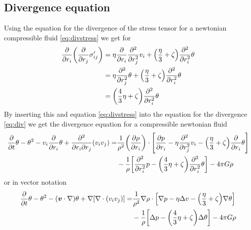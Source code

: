\subsection{Divergence equation}
Using the equation for the divergence of the stress tensor
for a newtonian compressible fluid \eqref{eq:divstress} we get for
\begin{align}
\begin{split}
\pd{r_i}\lra{\pd{r_j}\sigma'_{ij}}&=
\eta\pd{r_i}\pdd{r_j}v_i+\lra{\frac{\eta}{3}+\zeta}\pdd{r_i}\theta\\
&=\eta\pdd{r_j}\theta+\lra{\frac{\eta}{3}+\zeta}\pdd{r_i}\theta\\
&=\lra{\frac{4}{3}\eta+\zeta}\pdd{r_i}\theta
\end{split}
\end{align}
By inserting this and equation \eqref{eq:divstress} into the equation for the
divergence \eqref{eq:div} we get the divergence equation for a compressible
newtonian fluid
\begin{align}
\begin{split}
\pd{t}\theta-\theta^2-v_i\pd{r_i}\theta
+\frac{\partial^2}{\partial r_i \partial r_j}(v_i v_j) =&
\frac{1}{\rho^2}\lra{\ppd{r_i}{\rho}} \cdot
\lrb{\ppd{r_i}{p}-\eta\pdd{r_j}v_i-\lra{\frac{\eta}{3}+\zeta}
\pd{r_i}\theta}\\
&-\frac{1}{\rho}\lrb{\pdd{r_i}p-\lra{\frac{4}{3}\eta+\zeta}\pdd{r_i}\theta} 
-4\pi G \rho
\end{split}
\end{align}
or in vector notation
\begin{align}
\begin{split}
\pd{t}\theta-\theta^2-(\vec{v}\cdot \nabla)\theta 
+\nabla\lrb{\nabla\cdot(v_i v_j)}=&
\frac{1}{\rho^2}\nabla \rho \cdot \lrb{\nabla p - \eta \Delta v
-\lra{\frac{\eta}{3}+\zeta}\nabla \theta}\\
&-\frac{1}{\rho}\lrb{\Delta p-\lra{\frac{4}{3}\eta+\zeta}\Delta\theta}
-4\pi G \rho
\end{split}
\end{align}
